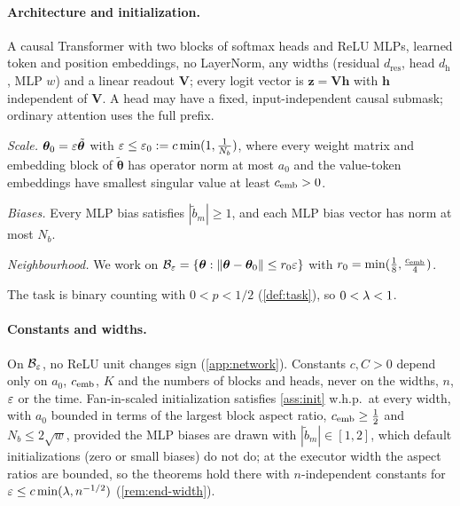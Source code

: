 \paragraph{Architecture and initialization.}

\begin{assumption}[Architecture]
\label{ass:arch}
A causal Transformer with two blocks of softmax heads and ReLU MLPs, learned token and position
embeddings, no LayerNorm, any widths (residual $d_{\mathrm{res}}$, head $d_{\mathrm h}$, MLP $w$) and a linear readout $\mathbf V$;
every logit vector is $\bm z=\mathbf V\bm h$ with $\bm h$ independent of $\mathbf V$. A head may have a fixed, input-independent causal submask;
ordinary attention uses the full prefix.
\end{assumption}

\begin{assumption}[Initialization]
\label{ass:init}
\emph{Scale.} $\bm\theta_0=\varepsilon\tilde{\bm\theta}$ with $\varepsilon\le\varepsilon_0:=c\min(1,\frac{1}{N_b})$, where every weight matrix and embedding block of $\tilde{\bm\theta}$ has operator norm
at most $a_0$ and the value-token embeddings have smallest singular value at least $c_{\mathrm{emb}}>0$.

\emph{Biases.} Every MLP bias satisfies $|\tilde b_m|\ge1$, and each MLP bias vector has norm at most $N_b$.

\emph{Neighbourhood.} We work on
$\mathcal B_{\varepsilon}=\{\bm\theta:\|\bm\theta-\bm\theta_0\|\le r_0\varepsilon\}$ with $r_0=\min(\frac{1}{8},\frac{c_{\mathrm{emb}}}{4})$.
\end{assumption}

\begin{assumption}[Task]
\label{ass:task}
The task is binary counting with $0<p<1/2$ (\cref{def:task}), so $0<\lambda<1$.
\end{assumption}

\paragraph{Constants and widths.} On $\mathcal B_{\varepsilon}$, no ReLU unit changes sign (\cref{app:network}). Constants $c,C>0$ depend only on $a_0$, $c_{\mathrm{emb}}$, $K$
and the numbers of blocks and heads, never on the widths, $n$, $\varepsilon$ or the time. Fan-in-scaled initialization
satisfies \cref{ass:init} w.h.p.\ at every width, with $a_0$ bounded in terms of the largest block aspect ratio,
$\embconst\ge\tfrac{1}{2}$ and $N_b\le2\sqrt w$, provided the MLP biases are drawn with $|\tilde b_m|\in[1,2]$, which default
initializations (zero or small biases) do not do; at the executor width the aspect ratios are bounded, so the theorems
hold there with $n$-independent constants for $\varepsilon\le c\min(\lambda,n^{-1/2})$ (\cref{rem:end-width}).

